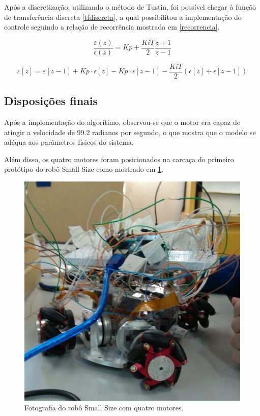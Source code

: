 \documentclass[a4paper,11pt]{article}
\begin{document}
		Após a discretização, utilizando o método de Tustin, foi possível chegar à função de transferência discreta \ref{tfdiscreta}, a qual possibilitou a implementação do controle seguindo a relação de recorrência mostrada em \ref{recorrencia}.
		
		\begin{equation}
			\frac{\varepsilon(z)}{\epsilon(z)}= Kp + \frac{Ki T}{2}\frac{z+1}{z-1} \label{tfdiscreta}
		\end{equation}
			
		\begin{equation}
			\varepsilon[z] = \varepsilon[z-1] + Kp\cdot\epsilon[z] - Kp\cdot\epsilon[z-1] - \frac{Ki T}{2}(\epsilon[z] + \epsilon[z-1]) \label{recorrencia}
		\end{equation}
		
		\subsection{Disposições finais}
		
		Após a implementação do algorítimo, observou-se que o motor era capaz de atingir a velocidade de 99.2 radianos por segundo, o que mostra que o modelo se adéqua aos parâmetros físicos do sistema.
		
		Além disso, os quatro motores foram posicionados na carcaça do primeiro protótipo do robô Small Size como mostrado em \ref{fig:smallfoto}.
		
		\begin{figure}[ht]
			\centering
			\includegraphics[width=0.7\linewidth]{images/smallfoto}
			\caption{Fotografia do robô Small Size com quatro motores.}
			\label{fig:smallfoto}
		\end{figure}
		
\end{document}
